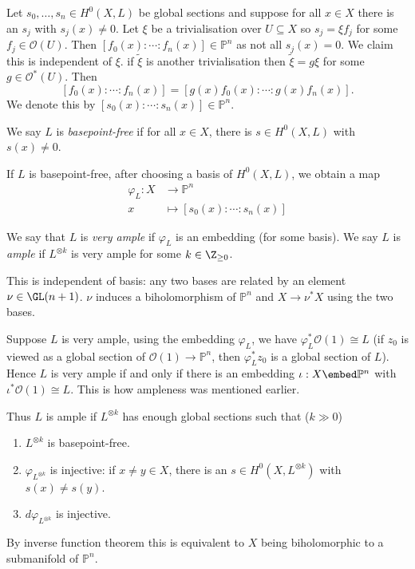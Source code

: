 \documentclass[a4paper]{article}
\renewcommand{\P}{\mathbb P} %
\begin{document}
Let \(s_0, \dots, s_n \in H^0(X, L)\) be global sections and suppose for all \(x \in X\) there is an \(s_j\) with \(s_j(x) \neq 0\). Let \(\xi\) be a trivialisation over \(U \subseteq X\) so \(s_j = \xi f_j\) for some \(f_j \in \mathcal O(U)\). Then \([f_0(x): \cdots : f_n(x)] \in \P^n\) as not all \(s_j(x) = 0\). We claim this is independent of \(\xi\). if \(\tilde \xi\) is another trivialisation then \(\tilde \xi = g \xi\) for some \(g \in \mathcal O^*(U)\). Then
\[
  [f_0(x): \cdots :f_n(x)] = [g(x) f_0(x): \cdots : g(x) f_n(x)].
\]
We denote this by \([s_0(x): \cdots : s_n(x)] \in \P^n\).

\begin{definition}
  We say \(L\) is \emph{basepoint-free} if for all \(x \in X\), there is \(s \in H^0(X, L)\) with \(s(x) \neq 0\).
\end{definition}
If \(L\) is basepoint-free, after choosing a basis of \(H^0(X, L)\), we obtain a map
\begin{align*}
  \varphi_L: X &\to \P^n \\
  x &\mapsto [s_0(x): \cdots :s_n(x)]
\end{align*}

\begin{definition}
  We say that \(L\) is \emph{very ample} if \(\varphi_L\) is an embedding (for some basis). We say \(L\) is \emph{ample} if \(L^{\otimes k}\) is very ample for some \(k \in \Z_{\geq 0}\).
\end{definition}
This is independent of basis: any two bases are related by an element \(\nu \in \GL(n + 1)\). \(\nu\) induces a biholomorphism of \(\P^n\) and \(X \to \nu^*X\) using the two bases.

Suppose \(L\) is very ample, using the embedding \(\varphi_L\), we have \(\varphi_L^* \mathcal O(1) \cong L\) (if \(z_0\) is viewed as a global section of \(\mathcal O(1) \to \P^n\), then \(\varphi_L^*z_0\) is a global section of \(L\)). Hence \(L\) is very ample if and only if there is an embedding \(\iota: X \embed \P^n\) with \(\iota^* \mathcal O(1) \cong L\). This is how ampleness was mentioned earlier.

Thus \(L\) is ample if \(L^{\otimes k}\) has enough global sections such that (\(k \gg 0\))
\begin{enumerate}
\item \(L^{\otimes k}\) is basepoint-free.
\item \(\varphi_{L^{\otimes k}}\) is injective: if \(x \neq y \in X\), there is an \(s \in H^0(X, L^{\otimes k})\) with \(s(x) \neq s(y)\).
\item \(d \varphi_{L^{\otimes k}}\) is injective.
\end{enumerate}
By inverse function theorem this is equivalent to \(X\) being biholomorphic to a submanifold of \(\P^n\).
\end{document}
